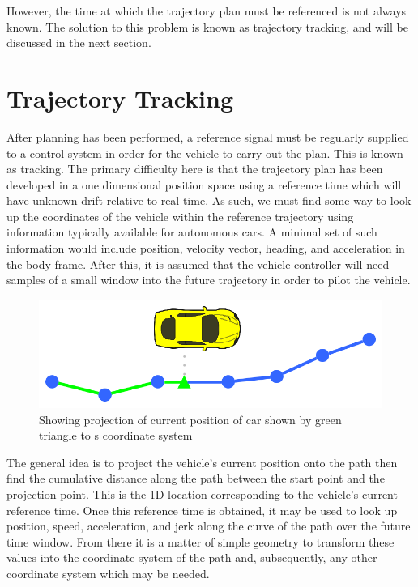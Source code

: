 \documentclass[letterpaper, 10 pt, conference]{ieeeconf}  %
\begin{document}
However, the time at which the trajectory plan must be referenced is not always known.
The solution to this problem is known as trajectory tracking, and will be discussed in the next section.


\section{Trajectory Tracking} \label{sec:trajectorytracking}

After planning has been performed, a reference signal must be regularly supplied to a control system in order for the vehicle to carry out the plan.
This is known as tracking.
The primary difficulty here is that the trajectory plan has been developed in a one dimensional position space using a reference time which will have unknown drift relative to real time.
As such, we must find some way to look up the coordinates of the vehicle within the reference trajectory using information typically available for autonomous cars.
A minimal set of such information would include position, velocity vector, heading, and acceleration in the body frame.
After this, it is assumed that the vehicle controller will need samples of a small window into the future trajectory in order to pilot the vehicle.

\begin{figure}[thpb]
  \centering
  \includegraphics[width=0.5\columnwidth]{graphics/PathProjection.png}
  \caption{Showing projection of current position of car shown by green triangle to s coordinate system}
  \label{fig:cartos}
\end{figure}

The general idea is to project the vehicle's current position onto the path then find the cumulative distance along the path between the start point and the projection point.
This is the 1D location corresponding to the vehicle's current reference time.
Once this reference time is obtained, it may be used to look up position, speed, acceleration, and jerk along the curve of the path over the future time window.
From there it is a matter of simple geometry to transform these values into the coordinate system of the path and, subsequently, any other coordinate system which may be needed.
\end{document}
